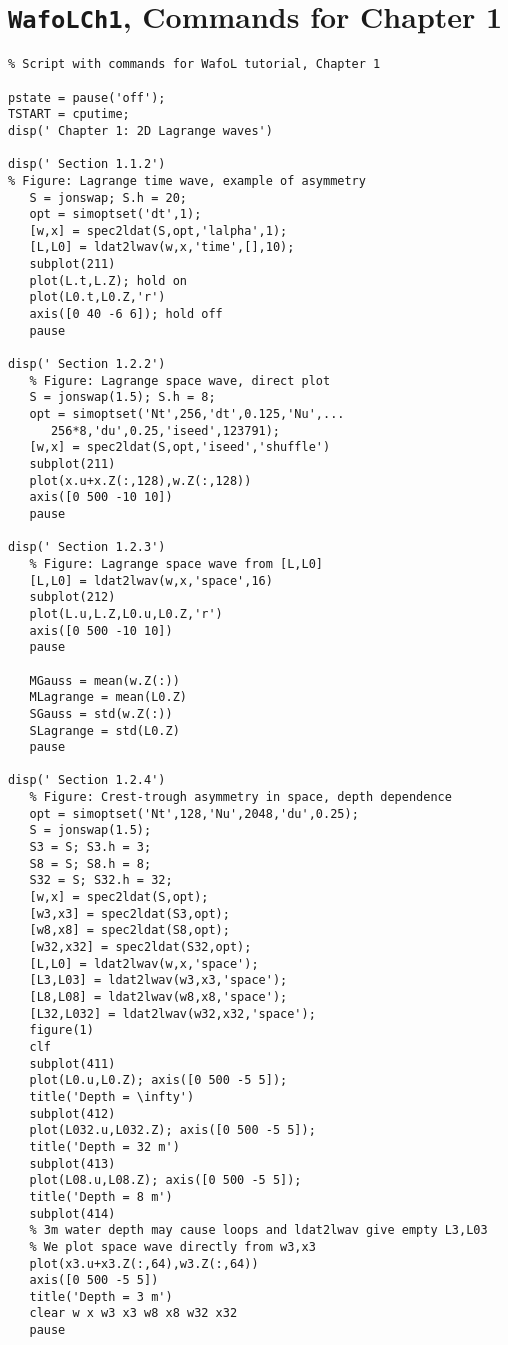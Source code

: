 \section{{\tt WafoLCh1}, Commands for Chapter 1}
{\small\begin{verbatim}
% Script with commands for WafoL tutorial, Chapter 1

pstate = pause('off');
TSTART = cputime;
disp(' Chapter 1: 2D Lagrange waves')

disp(' Section 1.1.2')
% Figure: Lagrange time wave, example of asymmetry
   S = jonswap; S.h = 20;
   opt = simoptset('dt',1);
   [w,x] = spec2ldat(S,opt,'lalpha',1);
   [L,L0] = ldat2lwav(w,x,'time',[],10);
   subplot(211)
   plot(L.t,L.Z); hold on 
   plot(L0.t,L0.Z,'r')
   axis([0 40 -6 6]); hold off
   pause
   
disp(' Section 1.2.2')
   % Figure: Lagrange space wave, direct plot
   S = jonswap(1.5); S.h = 8;
   opt = simoptset('Nt',256,'dt',0.125,'Nu',...
      256*8,'du',0.25,'iseed',123791);
   [w,x] = spec2ldat(S,opt,'iseed','shuffle')
   subplot(211)
   plot(x.u+x.Z(:,128),w.Z(:,128))
   axis([0 500 -10 10])
   pause
 
disp(' Section 1.2.3')
   % Figure: Lagrange space wave from [L,L0]
   [L,L0] = ldat2lwav(w,x,'space',16)
   subplot(212)
   plot(L.u,L.Z,L0.u,L0.Z,'r')
   axis([0 500 -10 10])
   pause
   
   MGauss = mean(w.Z(:))
   MLagrange = mean(L0.Z)
   SGauss = std(w.Z(:))
   SLagrange = std(L0.Z)
   pause
   
disp(' Section 1.2.4')
   % Figure: Crest-trough asymmetry in space, depth dependence
   opt = simoptset('Nt',128,'Nu',2048,'du',0.25);
   S = jonswap(1.5);
   S3 = S; S3.h = 3;
   S8 = S; S8.h = 8;
   S32 = S; S32.h = 32;
   [w,x] = spec2ldat(S,opt);
   [w3,x3] = spec2ldat(S3,opt);
   [w8,x8] = spec2ldat(S8,opt);
   [w32,x32] = spec2ldat(S32,opt);
   [L,L0] = ldat2lwav(w,x,'space');
   [L3,L03] = ldat2lwav(w3,x3,'space'); 
   [L8,L08] = ldat2lwav(w8,x8,'space');
   [L32,L032] = ldat2lwav(w32,x32,'space');
   figure(1)
   clf
   subplot(411)
   plot(L0.u,L0.Z); axis([0 500 -5 5]);
   title('Depth = \infty')
   subplot(412)
   plot(L032.u,L032.Z); axis([0 500 -5 5]);
   title('Depth = 32 m')
   subplot(413)
   plot(L08.u,L08.Z); axis([0 500 -5 5]); 
   title('Depth = 8 m')
   subplot(414) 
   % 3m water depth may cause loops and ldat2lwav give empty L3,L03
   % We plot space wave directly from w3,x3
   plot(x3.u+x3.Z(:,64),w3.Z(:,64))
   axis([0 500 -5 5])
   title('Depth = 3 m')
   clear w x w3 x3 w8 x8 w32 x32
   pause
   

\end{verbatim}}
